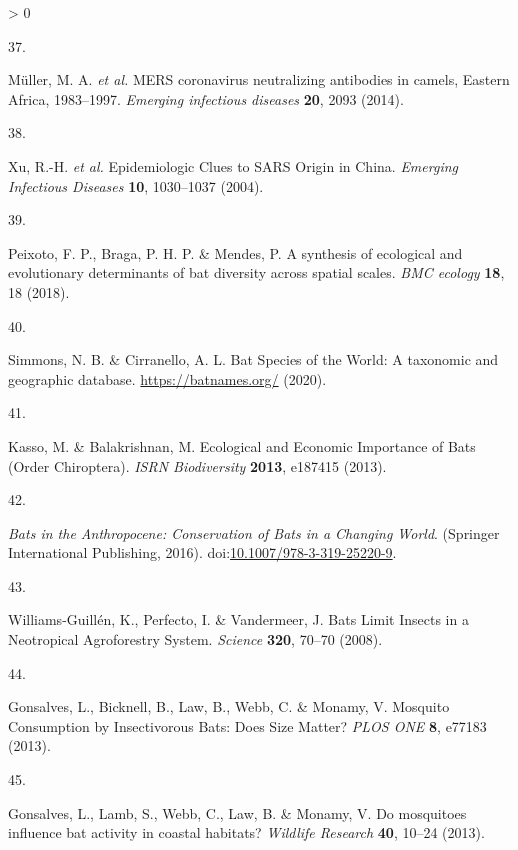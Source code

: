 \documentclass[10pt,oneside]{article}
\newlength{\cslhangindent}
\newlength{\csllabelwidth}
\newenvironment{CSLReferences}[3] %
 {%
  \setlength{\parindent}{0pt}
  \ifodd #1 \everypar{\setlength{\hangindent}{\cslhangindent}}\ignorespaces\fi
  \ifnum #2 > 0
  \setlength{\parskip}{#2\baselineskip}
  \fi
 }%
 {}
\newcommand{\CSLLeftMargin}[1]{\parbox[t]{\maxof{\widthof{#1}}{\csllabelwidth}}{#1}}
\newcommand{\CSLRightInline}[1]{\parbox[t]{\linewidth}{#1}}
\begin{document}
\begin{CSLReferences}{0}{0}
\leavevmode\hypertarget{ref-Muller2014Mers}{}%
\CSLLeftMargin{37. }
\CSLRightInline{Müller, M. A. \emph{et al.} MERS coronavirus
neutralizing antibodies in camels, Eastern Africa, 1983--1997.
\emph{Emerging infectious diseases} \textbf{20}, 2093 (2014).}

\leavevmode\hypertarget{ref-Xu2004Epidemiologic}{}%
\CSLLeftMargin{38. }
\CSLRightInline{Xu, R.-H. \emph{et al.} Epidemiologic Clues to SARS
Origin in China. \emph{Emerging Infectious Diseases} \textbf{10},
1030--1037 (2004).}

\leavevmode\hypertarget{ref-Peixoto2018Synthesis}{}%
\CSLLeftMargin{39. }
\CSLRightInline{Peixoto, F. P., Braga, P. H. P. \& Mendes, P. A
synthesis of ecological and evolutionary determinants of bat diversity
across spatial scales. \emph{BMC ecology} \textbf{18}, 18 (2018).}

\leavevmode\hypertarget{ref-Simmons2020Bat}{}%
\CSLLeftMargin{40. }
\CSLRightInline{Simmons, N. B. \& Cirranello, A. L. Bat Species of the
World: A taxonomic and geographic database. \url{https://batnames.org/}
(2020).}

\leavevmode\hypertarget{ref-Kasso2013Ecological}{}%
\CSLLeftMargin{41. }
\CSLRightInline{Kasso, M. \& Balakrishnan, M. Ecological and Economic
Importance of Bats (Order Chiroptera). \emph{ISRN Biodiversity}
\textbf{2013}, e187415 (2013).}

\leavevmode\hypertarget{ref-Voigt2016Bats}{}%
\CSLLeftMargin{42. }
\CSLRightInline{\emph{Bats in the Anthropocene: Conservation of Bats in
a Changing World}. (Springer International Publishing, 2016).
doi:\href{https://doi.org/10.1007/978-3-319-25220-9}{10.1007/978-3-319-25220-9}.}

\leavevmode\hypertarget{ref-Williams-Guillen2008Bats}{}%
\CSLLeftMargin{43. }
\CSLRightInline{Williams-Guillén, K., Perfecto, I. \& Vandermeer, J.
Bats Limit Insects in a Neotropical Agroforestry System. \emph{Science}
\textbf{320}, 70--70 (2008).}

\leavevmode\hypertarget{ref-Gonsalves2013Mosquito}{}%
\CSLLeftMargin{44. }
\CSLRightInline{Gonsalves, L., Bicknell, B., Law, B., Webb, C. \&
Monamy, V. Mosquito Consumption by Insectivorous Bats: Does Size Matter?
\emph{PLOS ONE} \textbf{8}, e77183 (2013).}

\leavevmode\hypertarget{ref-Gonsalves2013Mosquitoes}{}%
\CSLLeftMargin{45. }
\CSLRightInline{Gonsalves, L., Lamb, S., Webb, C., Law, B. \& Monamy, V.
Do mosquitoes influence bat activity in coastal habitats? \emph{Wildlife
Research} \textbf{40}, 10--24 (2013).}


\end{CSLReferences}
\end{document}
